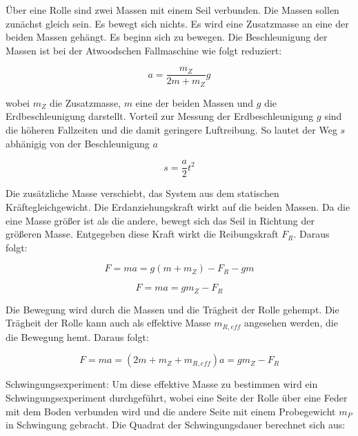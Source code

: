 \documentclass{protokoll}
\begin{document}
Über eine Rolle sind zwei Massen mit einem Seil verbunden.
Die Massen sollen zunächst gleich sein. Es bewegt sich nichts. Es wird eine
Zusatzmasse an eine der beiden Massen gehängt. Es beginn sich zu bewegen.
Die Beschleunigung der Massen ist bei der Atwoodschen Fallmaschine 
wie folgt reduziert:


\begin{equation}
 a = \frac{m_Z}{2m + m_Z} g 
\end{equation}




wobei $m_Z$ die Zusatzmasse, $ m $ eine der beiden Massen und 
$g$ die Erdbeschleunigung darstellt. 
Vorteil zur Messung der Erdbeschleunigung $g$ sind die höheren
Fallzeiten und die damit geringere Luftreibung.
So lautet der Weg $s$ abhänigig von der Beschleunigung $a$


\begin{equation}
 s = \frac{a}{2} t^2 
\end{equation}




Die zusätzliche Masse verschiebt, das System aus dem statischen Kräftegleichgewicht.
Die Erdanziehungskraft wirkt auf die beiden Massen. Da die eine Masse größer ist als die andere,
bewegt sich das Seil in Richtung der größeren Masse. Entgegeben diese Kraft wirkt die Reibungskraft $F_R$. Daraus folgt:


\begin{equation}
 F = ma = g(m + m_Z) - F_R - gm 
\end{equation}


\begin{equation}
 F = ma = gm_Z - F_R 
\end{equation}




Die Bewegung wird durch die Massen und die Trägheit der Rolle gehempt.
Die Trägheit der Rolle kann auch als effektive Masse $m_{R,eff}$ angesehen werden, die die Bewegung hemt.
Daraus folgt:

\begin{equation}
 F = ma = (2m + m_Z + m_{R,eff})a = gm_Z - F_R 
\end{equation}




Schwingungsexperiment: Um diese effektive Masse zu bestimmen wird ein Schwingungsexperiment durchgeführt, wobei eine
Seite der Rolle über eine Feder mit dem Boden verbunden wird und die andere Seite mit einem Probegewicht $m_P$
in Schwingung gebracht. Die Quadrat der Schwingungsdauer berechnet sich aus:
\end{document}
